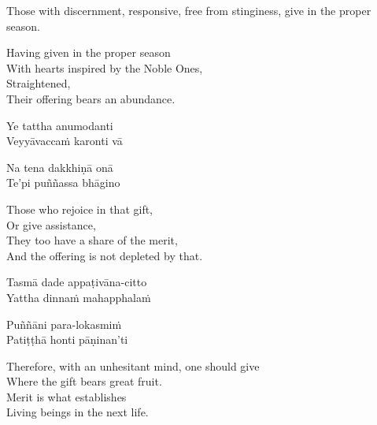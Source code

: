 \vspace{16pt}

\begin{english-verses}
  \begin{english-hangtogether}
    Those with discernment, responsive, free from stinginess, give in the proper season.
  \end{english-hangtogether}
  Having given in the proper season\\
  With hearts inspired by the Noble Ones,\\
  Straightened,\\
  Their offering bears an abundance.
\end{english-verses}

\begin{pali-hang}
  Ye tattha anumodanti\\
  Veyyāvaccaṁ karonti vā
\end{pali-hang}
\begin{pali-hangtogether}
  Na tena dakkhiṇā onā\\
  Te'pi puññassa bhāgino
\end{pali-hangtogether}

\begin{english-verses}
  Those who rejoice in that gift,\\
  Or give assistance,\\
  They too have a share of the merit,\\
  And the offering is not depleted by that.
\end{english-verses}

\begin{pali-hang}
  Tasmā dade appaṭivāna-citto\\
  Yattha dinnaṁ mahapphalaṁ
\end{pali-hang}
\begin{pali-hangtogether}
  Puññāni para-lokasmiṁ\\
  Patiṭṭhā honti pāṇinan'ti
\end{pali-hangtogether}

\begin{english-verses}
  Therefore, with an unhesitant mind, one should give\\
  Where the gift bears great fruit.\\
  Merit is what establishes\\
  Living beings in the next life.
\end{english-verses}

